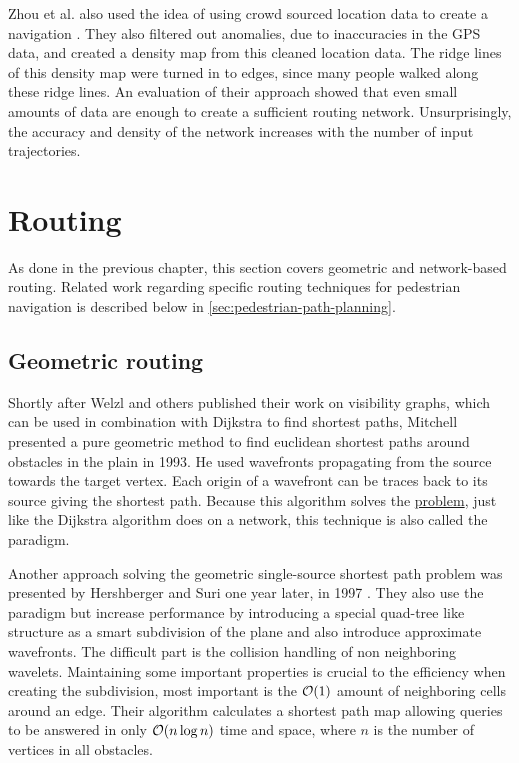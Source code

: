 		Zhou et al. also used the idea of using crowd sourced location data to create a navigation \cite{zhou-crowd-sourced-navigation}.
		They also filtered out anomalies, due to inaccuracies in the GPS data, and created a density map from this cleaned location data.
		The ridge lines of this density map were turned in to edges, since many people walked along these ridge lines.
		An evaluation of their approach showed that even small amounts of data are enough to create a sufficient routing network.
		Unsurprisingly, the accuracy and density of the network increases with the number of input trajectories.
	
\section{Routing}

	As done in the previous chapter, this section covers geometric and network-based routing.
	Related work regarding specific routing techniques for pedestrian navigation is described below in \cref{sec:pedestrian-path-planning}.
	
	\subsection{Geometric routing}
	
		\label{related-work:mitchell}
		Shortly after Welzl and others published their work on visibility graphs, which can be used in combination with Dijkstra to find shortest paths, Mitchell presented a pure geometric method to find euclidean shortest paths around obstacles in the plain in 1993\cite{mitchell-shortest-path}.
		He used wavefronts propagating from the source towards the target vertex.
		Each origin of a wavefront can be traces back to its source giving the shortest path.
		Because this algorithm solves the \hyperref[subsubsec:single-source-shortest-path]{ problem}, just like the Dijkstra algorithm does on a network, this technique is also called the  paradigm.
		
		Another approach solving the geometric single-source shortest path problem was presented by Hershberger and Suri one year later, in 1997 \cite{hershberger-suri}.
		They also use the  paradigm but increase performance by introducing a special quad-tree like structure as a smart subdivision of the plane and also introduce approximate wavefronts.
		The difficult part is the collision handling of non neighboring wavelets.
		Maintaining some important properties is crucial to the efficiency when creating the subdivision, most important is the $\mathcal{O}(1)$ amount of neighboring cells around an edge.
		Their algorithm calculates a shortest path map allowing queries to be answered in only $\mathcal{O}(n \log n)$ time and space, where $n$ is the number of vertices in all obstacles.
		
